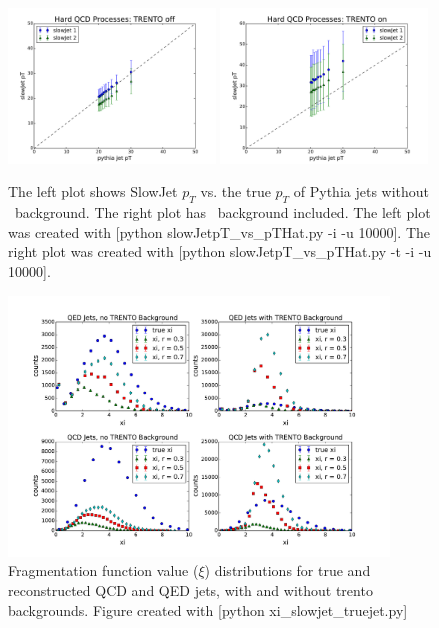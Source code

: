 \documentclass[11pt]{article}
\begin{document}
\begin{figure}[h]
\begin{center}
\includegraphics[width=0.49\textwidth]{slowpT_vs_pThat_pythia.pdf}
\includegraphics[width=0.49\textwidth]{slowpT_vs_pThat_pythia_trento.pdf}
\caption{The left plot shows SlowJet $p_T$ vs. the true $p_T$ of Pythia jets without \trento\ background. The right plot has \trento\ background included. The left plot was created with [python slowJetpT\_vs\_pTHat.py -i -u 10000]. The right plot was created with [python slowJetpT\_vs\_pTHat.py -t -i -u 10000].}
\label{fig_slowJet_vs_pTHat}
\end{center}
\end{figure}

\begin{figure}[h]
\begin{center}
\includegraphics[width=0.9\textwidth]{xi_slowjet_truejet.pdf}
\caption{Fragmentation function value ($\xi$) distributions for true and reconstructed QCD and QED jets, with and without trento backgrounds.  Figure created with [python xi\_slowjet\_truejet.py]}
\label{fig_xi_slowjet_truejet}
\end{center}
\end{figure}
\end{document}
